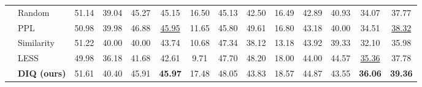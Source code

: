 \documentclass[letterpaper]{article} %
\newcommand{\TableLineColor}{\rowcolor{lightblue}}
\begin{document}
\begin{table}[!t]
\begin{adjustbox}{max width=1.0\textwidth}
\begin{tabular}{llcccccccccccc}
                                                    & Random                                             & 51.14                             & 39.04                             & 45.27                             & 45.15                                & 16.50                            & 45.13                             & 42.50                             & 16.49                             & 42.89                             & 40.93                             & 34.07                                & 37.77                                \\
                                                    & PPL                                                & 50.98                             & 39.98                             & 46.88                             & \underline{45.95}                                & 11.65                            & 45.80                             & 49.61                             & 16.80                             & 43.18                             & 40.00                             & 34.51                                & \underline{38.32}                                \\
                                                    & Similarity                                         & 51.22                             & 40.00                             & 40.00                             & 43.74                                & 10.68                            & 47.34                             & 38.12                             & 13.18                             & 43.92                             & 39.33                             & 32.10                                & 35.98                                \\
                                                    & LESS                                               & 49.98                             & 36.18                             & 41.68                             & 42.61                                & 9.71                             & 47.70                             & 48.20                             & 18.00                             & 44.00                             & 44.57                             & \underline{35.36}                                & 37.78                                \\
\TableLineColor \cellcolor{white}\multirow{-13}{*}{FineMed~\cite{finemedlm}} &  \textbf{DIQ (ours)}                                & 51.61                             & 40.40                             & 45.91                             & \textbf{45.97}                       & 17.48                            & 48.05                             & 43.83                             & 18.57                             & 44.87                             & 43.55                             & \textbf{36.06}                       & \textbf{39.36}                       \\ \bottomrule

\end{tabular}
\end{adjustbox}
\end{table}
\end{document}
